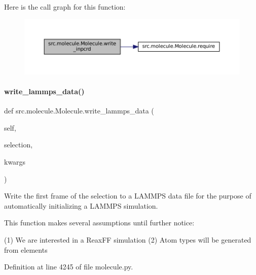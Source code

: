 Here is the call graph for this function\+:
\nopagebreak
\begin{figure}[H]
\begin{center}
\leavevmode
\includegraphics[width=350pt]{classsrc_1_1molecule_1_1Molecule_af975f93f5c43f518b84d0bd067c75604_cgraph}
\end{center}
\end{figure}
\mbox{\label{classsrc_1_1molecule_1_1Molecule_a7b85106cd6cc8e1d3e7e1ccb4edff551}} 
\paragraph{\texorpdfstring{write\+\_\+lammps\+\_\+data()}{write\_lammps\_data()}}
{\footnotesize\ttfamily def src.\+molecule.\+Molecule.\+write\+\_\+lammps\+\_\+data (\begin{DoxyParamCaption}\item[{}]{self,  }\item[{}]{selection,  }\item[{}]{kwargs }\end{DoxyParamCaption})}



Write the first frame of the selection to a L\+A\+M\+M\+PS data file for the purpose of automatically initializing a L\+A\+M\+M\+PS simulation. 

This function makes several assumptions until further notice\+:

(1) We are interested in a Reax\+FF simulation (2) Atom types will be generated from elements 

Definition at line 4245 of file molecule.\+py.

\mbox{\label{classsrc_1_1molecule_1_1Molecule_a94a0b29f772bb5e6e03383fd854ad70a}} 
